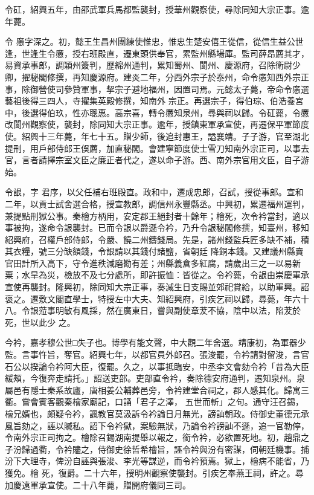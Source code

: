 \begin{pinyinscope}
 令矼，紹興五年，由邵武軍兵馬都監襲封，授華州觀察使，尋除同知大宗正事。逾年薨。



 令
 懬字深之。初，懿王生昌州團練使惟忠，惟忠生楚安僖王從信，從信生益公世逢，世逢生令懬，授右班殿直，遷東頭供奉官，累監州縣場庫。監司薛昂薦其才，易資承事郎，調穎州簽判，歷綿州通判，累知蜀州、閬州、慶源府，召除衛尉少卿，擢秘閣修撰，再知慶源府。建炎二年，分西外宗子於泰州，命令懬知西外宗正事，除御營使司參贊軍事，挈宗子避地福州，因置司焉。元懿太子薨，帝命令懬選藝祖後得三四人，寺擢集英殿修撰，知南外
 宗正。再選宗子，得伯琮、伯浩養宮中，後選得伯玖，性亦聰惠。高宗喜，轉令懬知泉州，尋與祠以歸。令矼薨，令懬改閬州觀察使，襲封，除同知大宗正事。逾年，授鎮東軍承宣使，再遷保平軍節度使。紹興十三年薨，年七十五。贈少師，後追封惠王，謚襄靖。子子游，官至湖北提刑，用戶部侍郎王俁薦，加直秘閣。會建寧節度使士雪刀知南外宗正司，以事去官，言者請擇宗室文臣之廉正者代之，遂以命子游。西、南外宗官用文臣，自子游始。



 令詪，字
 君序，以父任補右班殿直。政和中，遷成忠郎，召試，授從事郎。宣和二年，以貢士試舍選合格，授宣教郎，調信州永豐縣丞。中興初，累遷福州運判，兼提點刑獄公事。秦檜方柄用，安定郡王絕封者十餘年；檜死，次令衿當封，適以事被拘，遂命令詪襲封。已而令詪以爵遜令衿，乃升令詪秘閣修撰，知臺州，移知紹興府，召權戶部侍郎，令嚴、饒二州鑄錢局。先是，諸州錢監兵匠多缺不補，積其衣糧，號三分缺額錢，令詪請以其錢付諸鹽，省朝廷
 降銅本錢。又建議州縣賣官田計所入高下，守令進秩減磨勘有差；州縣義倉多紅腐，請歲出三之一以易新粟；水旱為災，檢放不及七分處所，即許振恤：皆從之。令衿薨，令詪由崇慶軍承宣使再襲封。隆興初，除同知大宗正事，奏減生日支賜並郊祀賞給，以助軍興。詔褒之。遷敷文閣直學士，特授左中大夫、知紹興府，引疾乞祠以歸，尋薨，年六十八。令詪蒞事明敏有風採，然在廣東日，嘗與副使章茇不協，陰中以法，陷茇於死，世以此少
 之。



 今衿，嘉孝穆公世□失子也。博學有能文聲，中大觀二年舍選。靖康初，為軍器少監。言事忤旨，奪官。紹興七年，以都官員外郎召。張浚罷，令衿請對留浚，言官石公以揆論令衿阿大臣，復罷。久之，以事抵臨安，中丞李文會劾令衿「昔為大臣緩頰，今復奔走請托。」詔送吏部。吏部直令衿，奏除德安府通判，遷知泉州。泉屬邑有隱士秦系故廬，唐相姜公輔葬邑旁，令衿建堂合祠之，郡人感其化。歸寓三衢。嘗會賓客觀秦檜家廟記，口誦「君子之澤，
 五世而斬」之句。通守汪召錫，檜兄婿也，頗疑令衿，諷教官莫汲訴令衿論日月無光，謗訕朝政。侍御史董德元承風旨劾之，誣以贓私。詔下令衿獄，案驗無狀，乃論令衿謗訕不遜，追一官勒停，令南外宗正司拘之。檜除召錫湖南提舉以報之，銜令衿，必欲置死地。初，趙鼎之子汾歸過衢，令衿贐之，侍御史徐哲希檜旨，誣令衿與汾有密謀，伺朝廷機事。捕汾下大理寺，俾汾自誣與張浚、李光等謀逆，而令衿預焉。獄上，檜病不能省，乃獲免。檜
 死，復爵。二十六年，授明州觀察使襲封。引疾乞奉燕王祠，許之。尋加慶遠軍承宣使。二十八年薨，贈開府儀同三司。




\end{pinyinscope}
